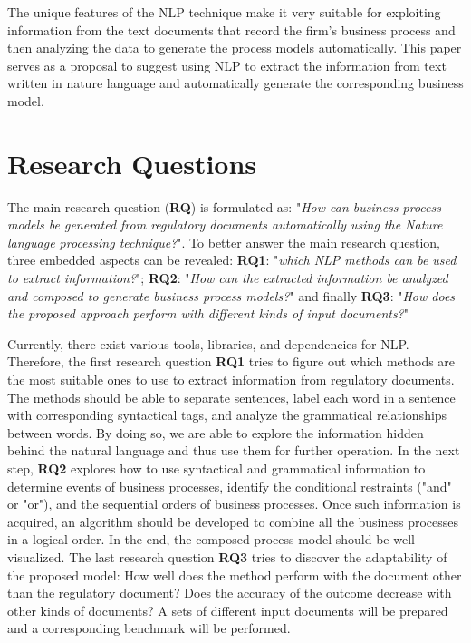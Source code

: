 	The unique features of the NLP technique make it very suitable for exploiting information from the text documents that record the firm's business process and then analyzing the data to generate the process models automatically. This paper serves as a proposal to suggest using NLP to extract the information from text written in nature language and automatically generate the corresponding business model.
	
	\section{Research Questions}

	The main research question (\textbf{RQ}) is formulated as: "\textit{How can business process models be generated from regulatory documents automatically using the Nature language processing technique?}". To better answer the main research question, three embedded aspects can be revealed: \textbf{RQ1}: "\textit{which NLP methods can be used to extract information?}"; \textbf{RQ2}: "\textit{How can the extracted information be analyzed and composed to generate business process models?}" and finally \textbf{RQ3}: "\textit{How does the proposed approach perform with different kinds of input documents?}"

	
	Currently, there exist various tools, libraries, and dependencies for NLP. Therefore, the first research question \textbf{RQ1} tries to figure out which methods are the most suitable ones to use to extract information from regulatory documents. The methods should be able to separate sentences, label each word in a sentence with corresponding syntactical tags, and analyze the grammatical relationships between words. By doing so, we are able to explore the information hidden behind the natural language and thus use them for further operation. In the next step, \textbf{RQ2} explores how to use syntactical and grammatical information to determine events of business processes, identify the conditional restraints ("and" or "or"), and the sequential orders of business processes. Once such information is acquired, an algorithm should be developed to combine all the business processes in a logical order. In the end, the composed process model should be well visualized. The last research question \textbf{RQ3} tries to discover the adaptability of the proposed model: How well does the method perform with the document other than the regulatory document? Does the accuracy of the outcome decrease with other kinds of documents? A sets of different input documents will be prepared and a corresponding benchmark will be performed. 